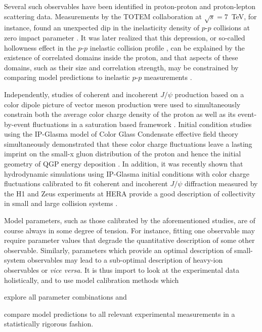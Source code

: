 \documentclass[aps,prc,reprint,amsmath,nofootinbib]{revtex4-1}
\begin{document}
Several such observables have been identified in proton-proton and proton-lepton scattering data.
Measurements by the TOTEM collaboration at $\sqrt{s}=7$~TeV, for instance, found an unexpected dip in the inelasticity density of $p$-$p$ collisions at zero impact parameter \cite{Antchev:2011zz}.
It was later realized that this depression, or so-called hollowness effect in the $p$-$p$ inelastic collision profile \cite{Arriola2016}, can be explained by the existence of correlated domains inside the proton, and that aspects of these domains, such as their size and correlation strength, may be constrained by comparing model predictions to inelastic $p$-$p$ measurements \cite{Albacete:2016gxu, Albacete:2016pmp}.

Independently, studies of coherent and incoherent $J/\psi$ production based on a color dipole picture of vector meson production were used to simultaneously constrain both the average color charge density of the proton as well as its event-by-event fluctuations in a saturation based framework \cite{Mantysaari:2016ykx, Mantysaari:2016jaz, Aaron:2009aa, Abramowicz:2015mha}.
Initial condition studies using the IP-Glasma model of Color Glass Condensate effective field theory \cite{Schenke:2012wb} simultaneously demonstrated that these color charge fluctuations leave a lasting imprint on the \mbox{small-x} gluon distribution of the proton and hence the initial geometry of QGP energy deposition \cite{Schlichting:2014ipa}.
In addition, it was recently shown that hydrodynamic simulations using IP-Glasma initial conditions with color charge fluctuations calibrated to fit coherent and incoherent $J/\psi$ diffraction measured by the H1 and Zeus experiments at HERA \cite{Aaron:2009aa, Abramowicz:2015mha} provide a good description of collectivity in small and large collision systems \cite{Schenke:2018fci}.

Model parameters, such as those calibrated by the aforementioned studies, are of course always in some degree of tension.
For instance, fitting one observable may require parameter values that degrade the quantitative description of some other observable.
Similarly, parameters which provide an optimal description of small-system observables may lead to a sub-optimal description of heavy-ion observables or \emph{vice versa}.
It is thus import to look at the experimental data holistically, and to use model calibration methods which
\begin{enumerate*}[label=(\arabic*)]
  \item explore all parameter combinations and
  \item compare model predictions to all relevant experimental measurements in a statistically rigorous fashion.
\end{enumerate*}
\end{document}
